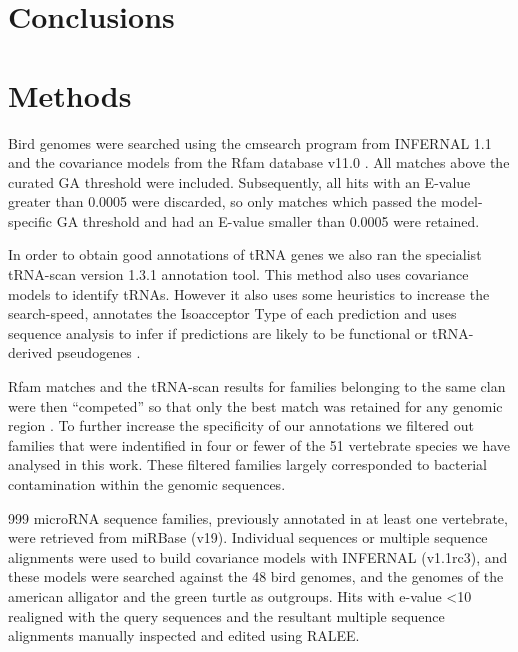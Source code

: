 \documentclass[10pt]{bmc_article}
\newenvironment{bmcformat}{\begin{raggedright}\baselineskip20pt\sloppy\setboolean{publ}{false}}{\end{raggedright}\baselineskip20pt\sloppy}
\begin{document}
\begin{bmcformat}
\section*{Conclusions}



\section*{Methods}

Bird genomes were searched using the cmsearch program from INFERNAL
1.1 and the covariance models from the Rfam database
v11.0 \cite{Gardner:2011a,Burge:2013}. All matches above the curated GA
threshold were included. Subsequently, all hits with an E-value
greater than 0.0005 were discarded, so only matches which passed the
model-specific GA threshold and had an E-value smaller than 0.0005
were retained. 

In order to obtain good annotations of tRNA genes we also ran the
specialist tRNA-scan version 1.3.1 annotation tool. This method also
uses covariance models to identify tRNAs. However it also uses some
heuristics to increase the search-speed, annotates the Isoacceptor
Type of each prediction and uses sequence analysis to infer if
predictions are likely to be functional or tRNA-derived pseudogenes
\cite{Lowe:1997,Chan:2009}.

Rfam matches and the tRNA-scan results for families belonging to the
same clan were then ``competed'' so that only the best match was
retained for any genomic region \cite{Gardner:2011a}.  To further
increase the specificity of our annotations we filtered out families
that were indentified in four or fewer of the 51 vertebrate species we
have analysed in this work. These filtered families largely
corresponded to bacterial contamination within the genomic sequences.

999 microRNA sequence families, previously annotated in at least one
vertebrate, were retrieved from miRBase (v19). Individual sequences or
multiple sequence alignments were used to build covariance models with
INFERNAL (v1.1rc3), and these models were searched against the 48 bird
genomes, and the genomes of the american alligator and the green
turtle as outgroups. Hits with e-value <10 realigned with the query
sequences and the resultant multiple sequence alignments manually
inspected and edited using RALEE.


\end{bmcformat}
\end{document}
